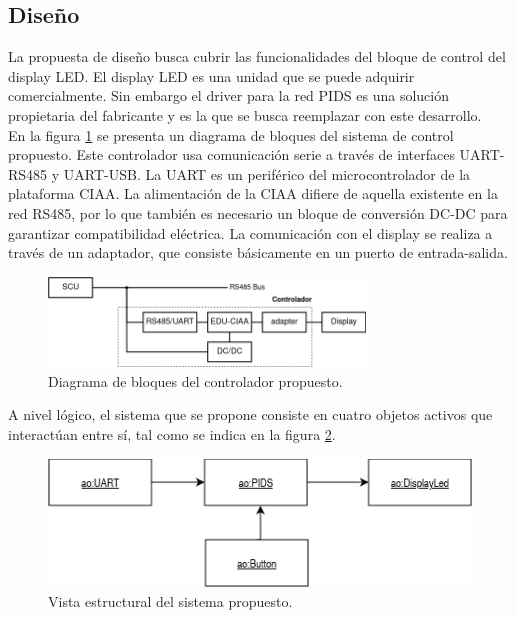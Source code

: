 \subsection{Diseño}
La propuesta de diseño busca cubrir las funcionalidades del bloque de control del display LED. El display LED es una unidad que se puede adquirir comercialmente. Sin embargo el driver para la red PIDS es una solución propietaria del fabricante y es la que se busca reemplazar con este desarrollo.\\

En la figura \ref{fig:diagVistaReDisenhoEduCIAA} se presenta un diagrama de bloques del sistema de control propuesto. Este controlador usa comunicación serie a través de interfaces UART-RS485 y UART-USB. La UART es un periférico del microcontrolador de la plataforma CIAA. La alimentación de la CIAA difiere de aquella existente en la red RS485, por lo que también es necesario un bloque de conversión DC-DC para garantizar compatibilidad eléctrica. La comunicación con el display se realiza a través de un adaptador, que consiste básicamente en un puerto de entrada-salida.\\


\begin{figure}[ht]
	\centering
	\includegraphics[width=0.75\textwidth]{./Figures/diagVistaReDisenhoEduCIAA.png}
	\caption{Diagrama de bloques del controlador propuesto.}
	\label{fig:diagVistaReDisenhoEduCIAA}
\end{figure}

A nivel lógico, el sistema que se propone consiste en cuatro objetos activos que interactúan entre sí, tal como se indica en la figura \ref{fig:diagVistaDisenho}. 

\begin{figure}[ht]
	\centering
	\includegraphics[width=1\textwidth]{./Figures/diagVistaDisenho.png}
	\caption{Vista estructural del sistema propuesto.}
	\label{fig:diagVistaDisenho}
\end{figure}

